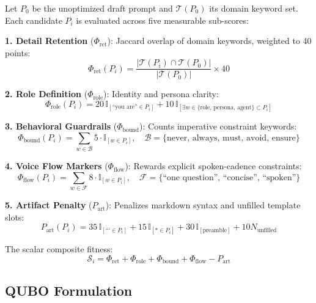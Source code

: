 \documentclass[conference]{IEEEtran}
\begin{document}
Let $P_0$ be the unoptimized draft prompt and $\mathcal{T}(P_0)$ its domain keyword set. Each candidate $P_i$ is evaluated across five measurable sub-scores:

\textbf{1. Detail Retention} ($\Phi_{\text{ret}}$): Jaccard overlap of domain keywords, weighted to 40 points:
\begin{equation}
\Phi_{\text{ret}}(P_i) = \frac{|\mathcal{T}(P_i) \cap \mathcal{T}(P_0)|}{|\mathcal{T}(P_0)|} \times 40
\end{equation}

\textbf{2. Role Definition} ($\Phi_{\text{role}}$): Identity and persona clarity:
\begin{equation}
\Phi_{\text{role}}(P_i) = 20\,\mathbb{I}_{[\text{``you are''} \in P_i]} + 10\,\mathbb{I}_{[\exists w \in \{\text{role, persona, agent}\} \subset P_i]}
\end{equation}

\textbf{3. Behavioral Guardrails} ($\Phi_{\text{bound}}$): Counts imperative constraint keywords:
\begin{equation}
\Phi_{\text{bound}}(P_i) = \sum_{w \in \mathcal{B}} 5 \cdot \mathbb{I}_{[w \in P_i]}, \quad \mathcal{B} = \{\text{never, always, must, avoid, ensure}\}
\end{equation}

\textbf{4. Voice Flow Markers} ($\Phi_{\text{flow}}$): Rewards explicit spoken-cadence constraints:
\begin{equation}
\Phi_{\text{flow}}(P_i) = \sum_{w \in \mathcal{F}} 8 \cdot \mathbb{I}_{[w \in P_i]}, \quad \mathcal{F} = \{\text{``one question'', ``concise'', ``spoken''}\}
\end{equation}

\textbf{5. Artifact Penalty} ($P_{\text{art}}$): Penalizes markdown syntax and unfilled template slots:
\begin{equation}
P_{\text{art}}(P_i) = 35\,\mathbb{I}_{[\text{```}\in P_i]} + 15\,\mathbb{I}_{[* \in P_i]} + 30\,\mathbb{I}_{[\text{preamble}]} + 10 N_{\text{unfilled}}
\end{equation}

The scalar composite fitness:
\begin{equation}
\mathcal{S}_i = \Phi_{\text{ret}} + \Phi_{\text{role}} + \Phi_{\text{bound}} + \Phi_{\text{flow}} - P_{\text{art}}
\end{equation}

\subsection{QUBO Formulation}
\end{document}
